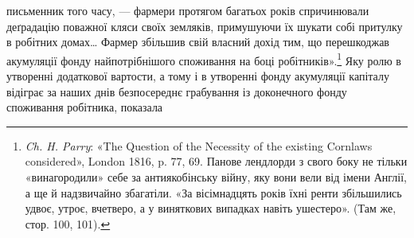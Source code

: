 письменник того часу, — фармери протягом багатьох років
спричинювали деґрадацію поважної кляси своїх земляків, примушуючи
їх шукати собі притулку в робітних домах\dots{} Фармер
збільшив свій власний дохід тим, що перешкоджав акумуляції
фонду найпотрібнішого споживання на боці робітників».\footnote{
\emph{Ch. H. Parry}: «The Question of the Necessity of the existing Cornlaws
considered», London 1816, p. 77, 69. Панове лендлорди з свого боку
не тільки «винагородили» себе за антиякобінську війну, яку вони вели
від імени Англії, а ще й надзвичайно збагатіли. «За вісімнадцять років
їхні ренти збільшились удвоє, утроє, вчетверо, а у виняткових випадках
навіть ушестеро». (Там же, стор. 100, 101).
} Яку
ролю в утворенні додаткової вартости, а тому і в утворенні
фонду акумуляції капіталу відіграє за наших днів безпосереднє
грабування із доконечного фонду споживання робітника, показала
\parbreak{}  %
